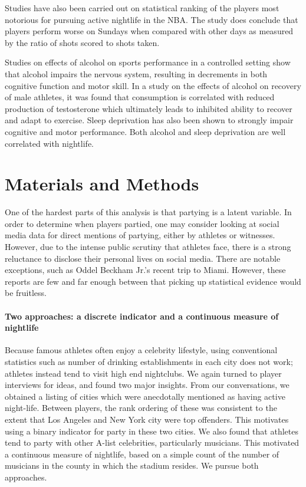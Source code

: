 \documentclass[letterpaper,12pt]{article}
\begin{document}
Studies have also been carried out on statistical ranking of the players
most notorious for pursuing active nightlife in the NBA.\cite{chase} The study
does conclude that players perform worse on Sundays when compared with other days
as measured by the ratio of shots scored to shots taken.

Studies on effects of alcohol on sports performance in a controlled setting
show that alcohol impairs the nervous system, resulting in decrements in both
cognitive function and motor skill.\cite{shirreffs} In a study on 
the effects of alcohol on recovery of male athletes, it was found that
consumption is correlated with reduced production of testosterone
which ultimately leads to inhibited ability to recover and adapt to exercise.\cite{mjbarnes}
Sleep deprivation has also been shown to strongly impair cognitive and motor performance.\cite{pilcher} Both alcohol and sleep deprivation are well correlated with nightlife.

\section{Materials and Methods}
One of the hardest parts of this analysis is that partying is a latent variable.
In order to determine when players partied, one may consider looking at social media data
for direct mentions of partying, either by athletes or witnesses. However, due to the
intense public scrutiny that athletes face, there is a strong reluctance to disclose
their personal lives on social media. There are notable exceptions, such
as Oddel Beckham Jr.'s recent trip to Miami.\cite{bleler}
However, these reports are few and far enough between that picking up statistical 
evidence would be fruitless.

\paragraph{Two approaches: a discrete indicator and a continuous measure of nightlife}
Because famous athletes often enjoy a celebrity lifestyle, using conventional statistics
such as number of drinking establishments in each city does not work; athletes instead
tend to visit high end nightclubs. We again turned to player interviews for ideas,
and found two major insights. From our conversations, 
we obtained a listing of cities which were anecdotally
mentioned as having active night-life. Between players, the rank ordering of these
was consistent to the extent that Los Angeles and New York city were top
offenders. This motivates using a binary indicator for party in these two cities. 
We also found that athletes tend to party with other A-list celebrities,
particularly musicians. This motivated a continuous measure of nightlife, based on a
simple count of the number of musicians in the county in which the stadium resides. 
We pursue both approaches.
\end{document}
